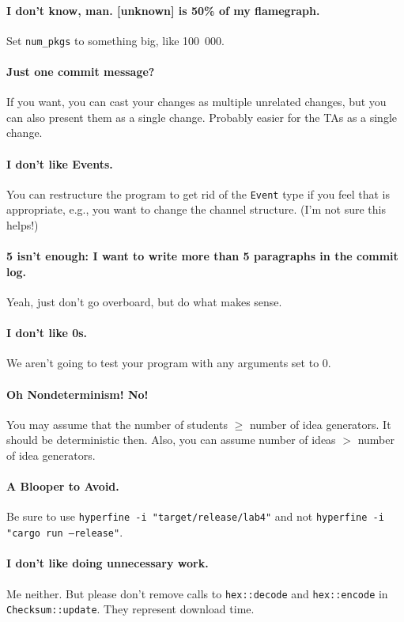 \paragraph{I don't know, man. [unknown] is 50\% of my flamegraph.} Set \texttt{num\_pkgs} to something big, like 100~000.

\paragraph{Just one commit message?} If you want, you can cast your changes as multiple unrelated changes, but you can also 
present them as a single change. Probably easier for the TAs as a single change.

\paragraph{I don't like Events.} You can restructure the program to get rid of the \texttt{Event} type if you feel that is
appropriate, e.g., you want to change the channel structure. (I'm not sure this helps!)

\paragraph{5 isn't enough: I want to write more than 5 paragraphs in the commit log.} Yeah, just don't go overboard, but do
what makes sense.

\paragraph{I don't like 0s.} We aren't going to test your program with any arguments set to 0.

\paragraph{Oh Nondeterminism! No!} You may assume that the number of students $\geq$ number of idea generators.
It should be deterministic then. Also, you can assume number of ideas $>$ number of idea generators.

\paragraph{A Blooper to Avoid.} Be sure to use \texttt{hyperfine -i "target/release/lab4"} and not 
\texttt{hyperfine -i "cargo run --release"}.

\paragraph{I don't like doing unnecessary work.} Me neither. But please don't remove calls to \texttt{hex::decode} and \texttt{hex::encode} in \texttt{Checksum::update}. They represent download time.


